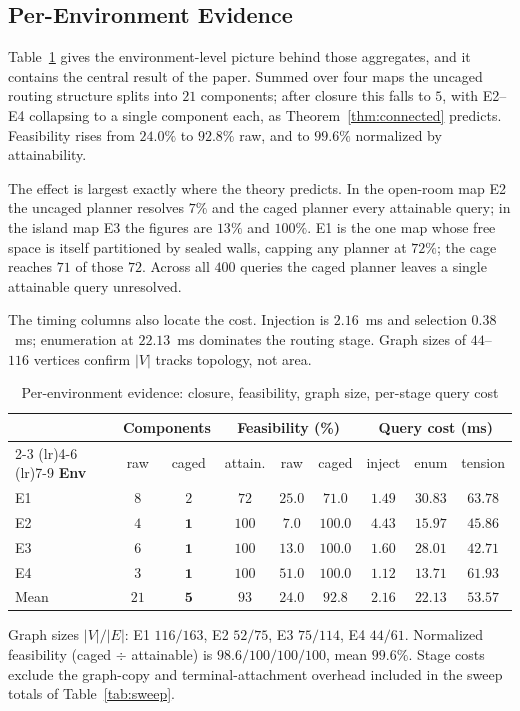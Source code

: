 \documentclass[conference]{IEEEtran}
\begin{document}
\subsection{Per-Environment Evidence}

Table~\ref{tab:perenv} gives the environment-level picture behind those aggregates, and it contains the central result of the paper. Summed over four maps the uncaged routing structure splits into $21$ components; after closure this falls to $5$, with E2--E4 collapsing to a single component each, as Theorem~\ref{thm:connected} predicts. Feasibility rises from $24.0\%$ to $92.8\%$ raw, and to $99.6\%$ normalized by attainability.

The effect is largest exactly where the theory predicts. In the open-room map E2 the uncaged planner resolves $7\%$ and the caged planner every attainable query; in the island map E3 the figures are $13\%$ and $100\%$. E1 is the one map whose free space is itself partitioned by sealed walls, capping any planner at $72\%$; the cage reaches $71$ of those $72$. Across all $400$ queries the caged planner leaves a single attainable query unresolved.

The timing columns also locate the cost. Injection is $2.16$~ms and selection $0.38$~ms; enumeration at $22.13$~ms dominates the routing stage. Graph sizes of $44$--$116$ vertices confirm $|V|$ tracks topology, not area.

\begin{table}[htbp]
\caption{Per-environment evidence: closure, feasibility, graph size, per-stage query cost}
\label{tab:perenv}
\begin{center}
\setlength{\tabcolsep}{3.5pt}
\begin{tabular}{@{}lcccccccc@{}}
\toprule
& \multicolumn{2}{c}{\textbf{Components}} & \multicolumn{3}{c}{\textbf{Feasibility (\%)}} & \multicolumn{3}{c}{\textbf{Query cost (ms)}} \\
\cmidrule(lr){2-3} \cmidrule(lr){4-6} \cmidrule(lr){7-9}
\textbf{Env} & raw & caged & attain. & raw & caged & inject & enum & tension \\ \midrule
E1 & $8$ & $2$ & $72$ & $25.0$ & $71.0$ & $1.49$ & $30.83$ & $63.78$ \\
E2 & $4$ & $\mathbf{1}$ & $100$ & $7.0$ & $\mathbf{100.0}$ & $4.43$ & $15.97$ & $45.86$ \\
E3 & $6$ & $\mathbf{1}$ & $100$ & $13.0$ & $\mathbf{100.0}$ & $1.60$ & $28.01$ & $42.71$ \\
E4 & $3$ & $\mathbf{1}$ & $100$ & $51.0$ & $\mathbf{100.0}$ & $1.12$ & $13.71$ & $61.93$ \\ \midrule
Mean & $21$ & $\mathbf{5}$ & $93$ & $24.0$ & $\mathbf{92.8}$ & $2.16$ & $22.13$ & $53.57$ \\ \bottomrule
\end{tabular}
\end{center}
\footnotesize Graph sizes $|V|/|E|$: E1 $116/163$, E2 $52/75$, E3 $75/114$, E4 $44/61$. Normalized feasibility (caged $\div$ attainable) is $98.6/100/100/100$, mean $99.6\%$. Stage costs exclude the graph-copy and terminal-attachment overhead included in the sweep totals of Table~\ref{tab:sweep}.
\end{table}
\end{document}

